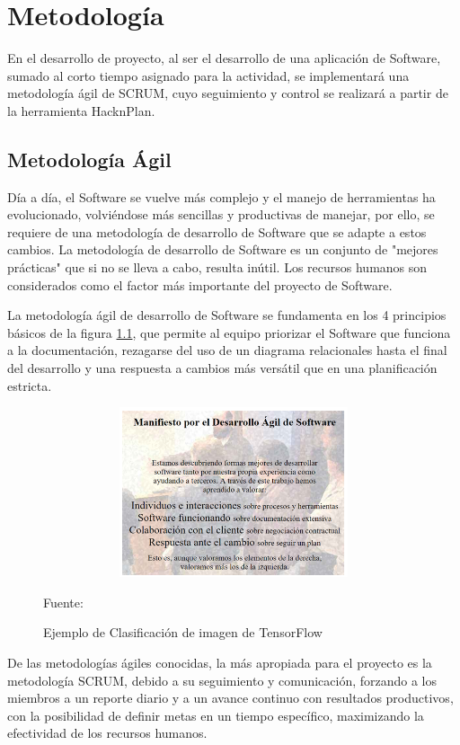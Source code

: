 \chapter{Metodología}

En el desarrollo de proyecto, al ser el desarrollo de una aplicación de Software, sumado al corto tiempo asignado para la actividad, se implementará una metodología ágil de SCRUM, cuyo seguimiento y control se realizará a partir de la herramienta HacknPlan.

\section{Metodología Ágil}

Día a día, el Software se vuelve más complejo y el manejo de herramientas ha evolucionado, volviéndose más sencillas y productivas de manejar, por ello, se requiere de una metodología de desarrollo de Software que se adapte a estos cambios.
La metodología de desarrollo de Software es un conjunto de "mejores prácticas" que si no se lleva a cabo, resulta inútil\cite{carrizo2018metodo}. Los recursos humanos son considerados como el factor más importante del proyecto de Software.

La metodología ágil de desarrollo de Software se fundamenta en los 4 principios básicos de la figura \ref{manifiesto}, que permite al equipo priorizar el Software que funciona a la documentación, rezagarse del uso de un diagrama relacionales hasta el final del desarrollo y una respuesta a cambios más versátil que en una planificación estricta.
\\
\begin{figure}[t!]
	\centering
	\includegraphics[width=13cm,height=5cm,]{./Images/manifiesto.png}
	\caption{Ejemplo de Clasificación de imagen de TensorFlow}
	\footnotesize Fuente: \cite{beck2001manifiesto}
	\label{manifiesto}
\end{figure}

De las metodologías ágiles conocidas, la más apropiada para el proyecto es la metodología SCRUM, debido a su seguimiento y comunicación, forzando a los miembros a un reporte diario y a un avance continuo con resultados productivos, con la posibilidad de definir metas en un tiempo específico, maximizando la efectividad de los recursos humanos.

